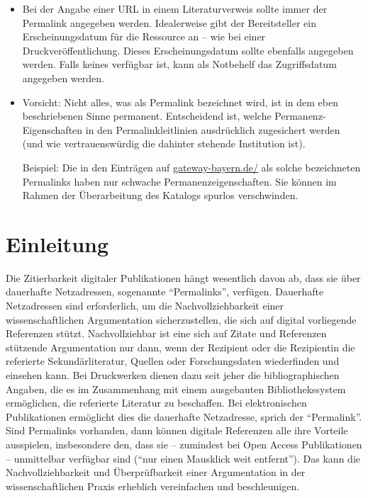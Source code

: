 \documentclass[12pt, a4paper]{article}
\begin{document}
\begin{itemize}
\item Bei der Angabe einer URL in einem Literaturverweis sollte immer
  der Permalink angegeben werden.
  Idealerweise gibt der Bereitsteller ein Erscheinungsdatum für die Ressource an
  -- wie bei einer Druckveröffentlichung. Dieses Erscheinungsdatum sollte
  ebenfalls angegeben werden. Falls keines verfügbar ist, kann als Notbehelf
  das Zugriffsdatum angegeben werden.

\item Vorsicht: Nicht alles, was als Permalink bezeichnet wird, ist in
  dem eben beschriebenen Sinne permanent. Entscheidend ist, welche
  Permanenz-Eigenschaften in den Permalinkleitlinien ausdrücklich
  zugesichert werden (und wie vertrauenswürdig die dahinter stehende
  Institution ist).

  Beispiel: Die in den Einträgen auf
  \href{http://gateway-bayern.de/}{gateway-bayern.\-de/}
  als solche bezeichneten Permalinks haben nur schwache
  Permanenzeigenschaften. Sie können im Rahmen der Überarbeitung des
  Katalogs spurlos verschwinden.
\end{itemize}


\section{Einleitung}
\label{einleitung}

Die Zitierbarkeit digitaler Publikationen hängt wesentlich davon ab,
dass sie über dauerhafte Netzadressen, sogenannte "`Permalinks"',
verfügen. Dauerhafte Netzadressen sind erforderlich, um die
Nachvollziehbarkeit einer wissenschaftlichen Argumentation
sicherzustellen, die sich auf digital vorliegende Referenzen stützt.
Nachvollziehbar ist eine sich auf Zitate und Referenzen stützende
Argumentation nur dann, wenn der Rezipient oder die Rezipientin die
referierte Sekundärliteratur, Quellen oder Forschungsdaten
wiederfinden und einsehen kann. Bei Druckwerken dienen dazu seit jeher
die bibliographischen Angaben, die es im Zusammenhang mit einem
ausgebauten Bibliothekssystem ermöglichen, die referierte Literatur zu
beschaffen. Bei elektronischen Publikationen ermöglicht dies die
dauerhafte Netzadresse, sprich der "`Permalink"'. Sind Permalinks
vorhanden, dann können digitale Referenzen alle ihre Vorteile
ausspielen, insbesondere den, dass sie -- zumindest bei Open Access
Publikationen -- unmittelbar verfügbar sind ("`nur einen Mausklick weit
entfernt"'). Das kann die Nachvollziehbarkeit und Überprüfbarkeit
einer Argumentation in der wissenschaftlichen Praxis erheblich
vereinfachen und beschleunigen.
\end{document}
